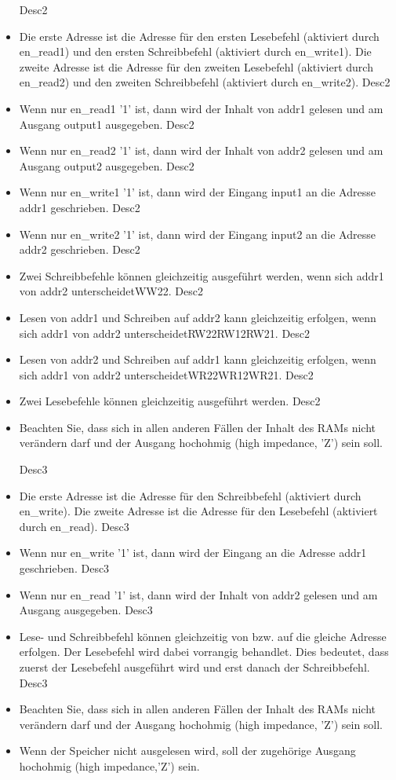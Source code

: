 \documentclass[a4paper,12pt]{article}
\begin{document}
\begin{itemize}
{{Desc2}}\item Die erste Adresse ist die Adresse f\"ur den ersten Lesebefehl (aktiviert durch en\_read1) und den ersten Schreibbefehl (aktiviert durch en\_write1). Die zweite Adresse ist die Adresse f\"ur den zweiten Lesebefehl (aktiviert durch en\_read2) und den zweiten Schreibbefehl (aktiviert durch en\_write2).
{{Desc2}}\item Wenn nur en\_read1 '1' ist, dann wird der Inhalt von addr1 gelesen und am Ausgang output1 ausgegeben.
{{Desc2}}\item Wenn nur en\_read2 '1' ist, dann wird der Inhalt von addr2 gelesen und am Ausgang output2 ausgegeben.
{{Desc2}}\item Wenn nur en\_write1 '1' ist, dann wird der Eingang input1 an die Adresse addr1 geschrieben.
{{Desc2}}\item Wenn nur en\_write2 '1' ist, dann wird der Eingang input2 an die Adresse addr2 geschrieben.
{{Desc2}}\item Zwei Schreibbefehle k\"onnen gleichzeitig ausgef\"uhrt werden, wenn sich addr1 von addr2 unterscheidet{{WW22}}.
{{Desc2}}\item Lesen von addr1 und Schreiben auf addr2 kann gleichzeitig erfolgen, wenn sich addr1 von addr2 unterscheidet{{RW22}}{{RW12}}{{RW21}}.
{{Desc2}}\item Lesen von addr2 und Schreiben auf addr1 kann gleichzeitig erfolgen, wenn sich addr1 von addr2 unterscheidet{{WR22}}{{WR12}}{{WR21}}.
{{Desc2}}\item Zwei Lesebefehle k\"onnen gleichzeitig ausgef\"uhrt werden.
{{Desc2}}\item Beachten Sie, dass sich in allen anderen F\"allen der Inhalt des RAMs nicht ver\"andern darf und der Ausgang hochohmig (high impedance, 'Z') sein soll.


{{Desc3}}\item Die erste Adresse ist die Adresse f\"ur den Schreibbefehl (aktiviert durch en\_write). Die zweite Adresse ist die Adresse f\"ur den Lesebefehl (aktiviert durch en\_read).
{{Desc3}}\item Wenn nur en\_write '1' ist, dann wird der Eingang an die Adresse addr1 geschrieben.
{{Desc3}}\item Wenn nur en\_read '1' ist, dann wird der Inhalt von addr2 gelesen und am Ausgang ausgegeben.
{{Desc3}}\item Lese- und Schreibbefehl k\"onnen gleichzeitig von bzw. auf die gleiche Adresse erfolgen. Der Lesebefehl wird dabei vorrangig behandlet. Dies bedeutet, dass zuerst der Lesebefehl ausgef\"uhrt wird und erst danach der Schreibbefehl.
{{Desc3}}\item Beachten Sie, dass sich in allen anderen F\"allen der Inhalt des RAMs nicht ver\"andern darf und der Ausgang hochohmig (high impedance, 'Z') sein soll.

\item Wenn der Speicher nicht ausgelesen wird, soll der zugeh\"orige Ausgang hochohmig (high impedance,'Z') sein.
\end{itemize}
\end{document}
